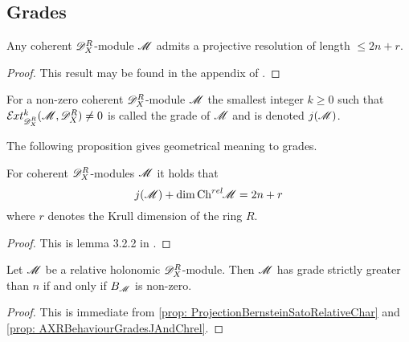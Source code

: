 \subsection{Grades}
\begin{proposition}\label{prop: ProjectiveResolutionLength}
  Any coherent $\mathscr{D}_X^R$-module $\mathscr{M}$ admits a projective resolution of length $\leq 2n + r$.
\end{proposition}
\begin{proof}
  This result may be found in the appendix of \cite{budur2019zero}.
\end{proof}
\begin{definition}
  For a non-zero coherent $\mathscr{D}_X^R$-module $\mathscr{M}$ the smallest integer $k\geq 0$ such that $\Ex{\D_X^R}{k}(\M,\D_X^R)\neq 0$ is called the grade of $\mathscr{M}$ and is denoted $j(\mathscr{M})$.
\end{definition}
The following proposition gives geometrical meaning to grades.
\begin{proposition}\label{prop: AXRBehaviourGradesJAndChrel}
  For coherent $\mathscr{D}_X^R$-modules $\mathscr{M}$ it holds that
  $$j(\mathscr{M}) + \dim \operatorname{Ch}^{rel}\mkern-5mu \mathscr{M} = 2n + r $$
  where $r$ denotes the Krull dimension of the ring $R$.
\end{proposition}
\begin{proof}
  This is lemma 3.2.2 in \cite{budur2019zero}.
\end{proof}
\begin{corollary}\label{cor: GradeIFFBernsteinIdeal}
  Let $\mathscr{M}$ be a relative holonomic $\mathscr{D}_X^R$-module. Then $\mathscr{M}$ has grade strictly greater than $n$ if and only if $B_{\mathscr{M}}$ is non-zero.
\end{corollary}
\begin{proof}
  This is immediate from \cref{prop: ProjectionBernsteinSatoRelativeChar} and \cref{prop: AXRBehaviourGradesJAndChrel}.
\end{proof}

